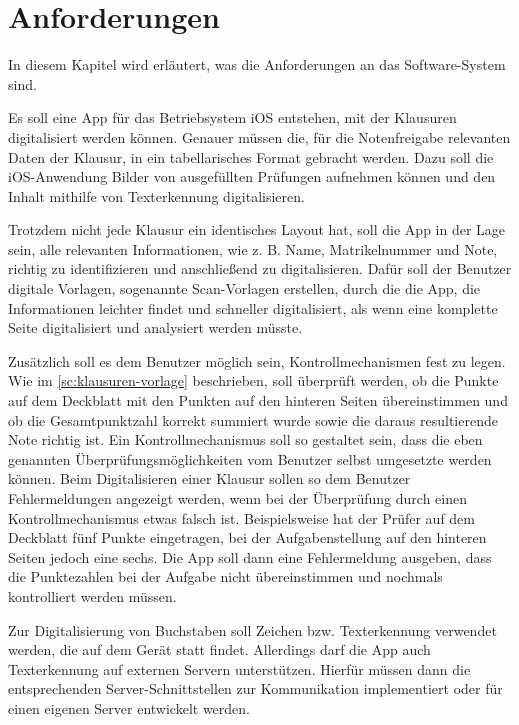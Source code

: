 \documentclass[notables, nomenclature, oneside, 150]{HSMW-Thesis}
\begin{document}

\chapter{Anforderungen}\label{ch:anforderungen}
	In diesem Kapitel wird erläutert, was die Anforderungen an das Software-System sind. 

	Es soll eine App für das Betriebsystem iOS entstehen, mit der Klausuren digitalisiert werden können. Genauer müssen die, für die Notenfreigabe relevanten Daten der Klausur, in ein tabellarisches Format gebracht werden. Dazu soll die iOS-Anwendung Bilder von ausgefüllten Prüfungen aufnehmen können und den Inhalt mithilfe von Texterkennung digitalisieren. 
	
	Trotzdem nicht jede Klausur ein identisches Layout hat, soll die App in der Lage sein, alle relevanten Informationen, wie z. B. Name, Matrikelnummer und Note, richtig zu identifizieren und anschließend zu digitalisieren. Dafür soll der Benutzer digitale Vorlagen, sogenannte Scan-Vorlagen erstellen, durch die die App, die Informationen leichter findet und schneller digitalisiert, als wenn eine komplette Seite digitalisiert und analysiert werden müsste. 
	
	Zusätzlich soll es dem Benutzer möglich sein, Kontrollmechanismen fest zu legen. Wie im \autoref{sc:klausuren-vorlage} beschrieben, soll überprüft werden, ob die Punkte auf dem Deckblatt mit den Punkten auf den hinteren Seiten übereinstimmen und ob die Gesamtpunktzahl korrekt summiert wurde sowie die daraus resultierende Note richtig ist. Ein Kontrollmechanismus soll so gestaltet sein, dass die eben genannten Überprüfungsmöglichkeiten vom Benutzer selbst umgesetzte werden können. Beim Digitalisieren einer Klausur sollen so dem Benutzer Fehlermeldungen angezeigt werden, wenn bei der Überprüfung durch einen Kontrollmechanismus etwas falsch ist. Beispielsweise hat der Prüfer auf dem Deckblatt fünf Punkte eingetragen, bei der Aufgabenstellung auf den hinteren Seiten jedoch eine sechs. Die App  soll dann eine Fehlermeldung ausgeben, dass die Punktezahlen bei der Aufgabe nicht übereinstimmen und nochmals kontrolliert werden müssen. 
 
 	Zur Digitalisierung von Buchstaben soll Zeichen bzw. Texterkennung verwendet werden, die auf dem Gerät statt findet. Allerdings darf die App auch Texterkennung auf externen Servern unterstützen. Hierfür müssen dann die entsprechenden Server-Schnittstellen zur Kommunikation implementiert oder für einen eigenen Server entwickelt werden.
\end{document}
